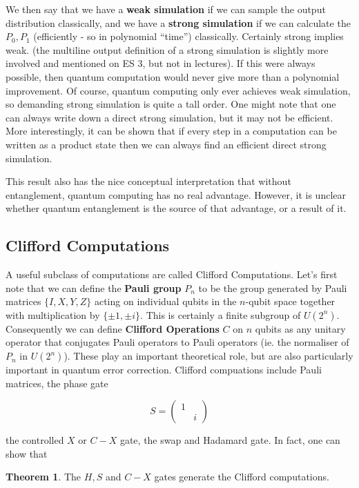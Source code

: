 \documentclass{article}
\theoremstyle{definition}
\newtheorem{theorem}{Theorem}
\begin{document}
We then say that we have a \textbf{weak simulation} if we can sample the output
distribution classically, and we have a \textbf{strong simulation} if we can
calculate the $P_0, P_1$ (efficiently - so in polynomial ``time'') classically.
Certainly strong implies weak. (the multiline output definition of a strong
simulation is slightly more involved and mentioned on ES 3, but not in
lectures). If this were always possible, then quantum computation would never
give more than a polynomial improvement. Of course, quantum computing only ever
achieves weak simulation, so demanding strong simulation is quite a tall order.
One might note that one can always write down a direct strong simulation, but it
may not be efficient. More interestingly, it can be shown that if every step in
a computation can be written as a product state then we can always find an
efficient direct strong simulation.

This result also has the nice conceptual interpretation that without
entanglement, quantum computing has no real advantage. However, it is unclear
whether quantum entanglement is the source of that advantage, or a result of it. 

\subsection{Clifford Computations}

A useful subclass of computations are called Clifford Computations. Let's first
note that we can define the \textbf{Pauli group} $P_n$ to be the group generated
by Pauli matrices $\{I, X, Y, Z\}$ acting on individual qubits in the $n$-qubit
space together with multiplication by $\{\pm 1, \pm i\}$. This is certainly a
finite subgroup of $U(2^n)$. Consequently we can define \textbf{Clifford
  Operations} $C$ on $n$ qubits as any unitary operator that conjugates Pauli
operators to Pauli operators (ie. the normaliser of $P_n$ in $U(2^n)$). These
play an important theoretical role, but are also particularly important in
quantum error correction. Clifford compuations include Pauli matrices, the phase
gate

$$ S =
\begin{pmatrix}
  1 & \\
  & i
\end{pmatrix} $$

the controlled $X$ or $C-X$ gate, the swap and Hadamard gate. In fact, one can
show that

\begin{theorem}
  The $H, S$ and $C-X$ gates generate the Clifford computations.
\end{theorem}
\end{document}
